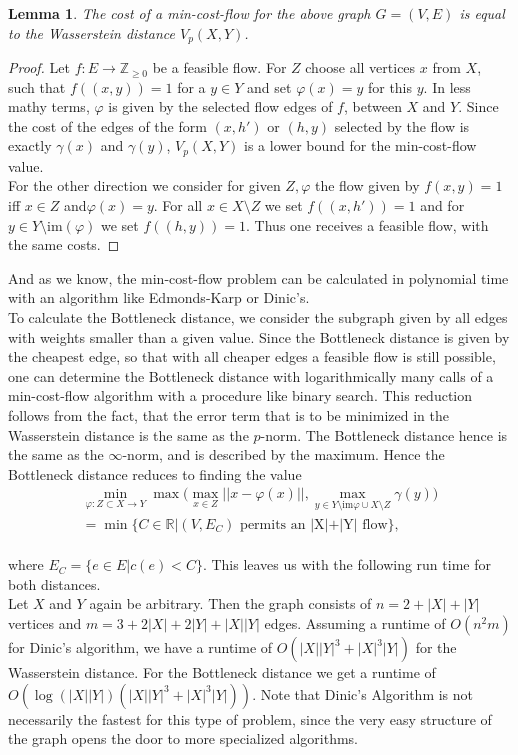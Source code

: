 \documentclass[11pt, a4paper, UKenglish]{article}
\newtheorem{lemma}{Lemma}
\newcommand{\bZ}{\mathbb{Z}}
\newcommand{\bR}{\mathbb{R}}
\newcommand{\im}{\textrm{im}}
\begin{document}
    \begin{lemma}
        The cost of a min-cost-flow for the above graph $G=(V,E)$ is equal to the Wasserstein distance $V_p(X,Y)$.
    \end{lemma}
    \begin{proof}
        Let $f:E\rightarrow \bZ_{\geq0}$ be a feasible flow.
        For $Z$ choose all vertices $x$ from $X$, such that $f((x,y))=1$ for a $y\in Y$ and set $\varphi(x) = y$ for this $y$.
        In less mathy terms, $\varphi$ is given by the selected flow edges of $f$, between $X$ and $Y$.
        Since the cost of the edges of the form $(x,h')$ or $(h,y)$ selected by the flow is exactly $\gamma(x)$ and $\gamma(y)$, $V_p(X,Y)$ is a lower bound for the min-cost-flow value.\\
        For the other direction we consider for given $Z,\varphi$ the flow given by $f(x,y)=1$ iff $x\in Z$ and$ \varphi(x)=y$.
        For all $x\in X\setminus Z$ we set $f((x,h'))=1$ and for $y\in Y\setminus \im(\varphi)$ we set $f((h,y))=1$.
        Thus one receives a feasible flow, with the same costs.
    \end{proof}

    And as we know, the min-cost-flow problem can be calculated in polynomial time with an algorithm like Edmonds-Karp or Dinic's.\\
    To calculate the Bottleneck distance, we consider the subgraph given by all edges with weights smaller than a given value.
    Since the Bottleneck distance is given by the cheapest edge, so that with all cheaper edges a feasible flow is still possible, one can determine the Bottleneck distance with logarithmically many calls of a min-cost-flow algorithm with a procedure like binary search.
    This reduction follows from the fact, that the error term that is to be minimized in the Wasserstein distance is the same as the $p$-norm.
    The Bottleneck distance hence is the same as the $\infty$-norm, and is described by the maximum.
    Hence the Bottleneck distance reduces to finding the value 
    \begin{gather*}
    	\min_{\varphi:Z\subset X \rightarrow Y} \max\bigg(\max_{x\in Z}||x - \varphi(x)||,\max_{y\in Y\setminus\im\varphi\cup X\setminus Z}\gamma(y)\bigg)\\
    	= \min\bigg\{C\in\bR \bigg| (V,E_C) \text{ permits an |X|+|Y| flow}\bigg\},
    \end{gather*}\\
    where $E_C=\{e\in E | c(e) < C\}$.
	This leaves us with the following run time for both distances.\\
    Let $X$ and $Y$ again be arbitrary.
    Then the graph consists of $n=2+|X|+|Y|$ vertices and $m=3+2|X|+2|Y|+|X||Y|$ edges.
    Assuming a runtime of $O(n^2 m)$ for Dinic's algorithm, we have a runtime of $O(|X||Y|^3 + |X|^3|Y|)$ for the Wasserstein distance.
    For the Bottleneck distance we get a runtime of $O(\log(|X||Y|)(|X||Y|^3 + |X|^3|Y|))$.
    Note that Dinic's Algorithm is not necessarily the fastest for this type of problem, since the very easy structure of the graph opens the door to more specialized algorithms.
\end{document}
